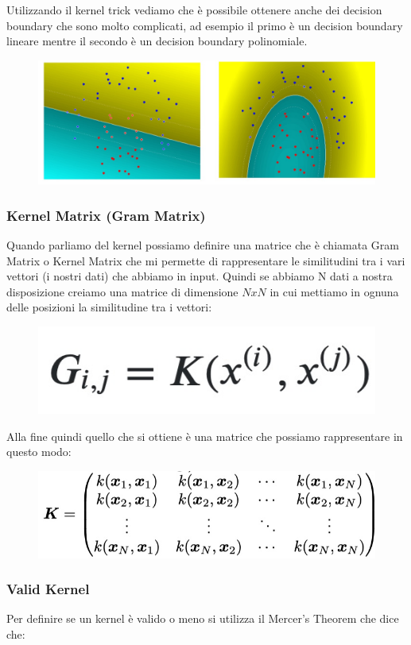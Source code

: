 \documentclass[14pt]{extreport}
\begin{document}
Utilizzando il kernel trick vediamo che è possibile ottenere anche dei decision boundary che sono molto complicati, ad esempio il primo è un decision
boundary lineare mentre il secondo è un decision boundary polinomiale.
\begin{figure}[H]
\centering
\includegraphics[width=0.5\linewidth]{339.jpeg}
\end{figure}

\subsubsection{Kernel Matrix (Gram Matrix)}

Quando parliamo del kernel possiamo definire una matrice che è chiamata Gram Matrix o Kernel Matrix che mi permette di rappresentare le similitudini
tra i vari vettori (i nostri dati) che abbiamo in input. Quindi se abbiamo N dati a nostra disposizione creiamo una matrice di dimensione $NxN$ in cui
mettiamo in ognuna delle posizioni la similitudine tra i vettori:
\begin{figure}[H]
\centering
\includegraphics[width=0.2\linewidth]{340.jpeg}
\end{figure}

Alla fine quindi quello che si ottiene è una matrice che possiamo rappresentare in questo modo:

\begin{figure}[H]
\centering
\includegraphics[width=0.5\linewidth]{341.jpeg}
\end{figure}


\subsubsection{Valid Kernel}

Per definire se un kernel è valido o meno si utilizza il Mercer's Theorem che dice che:
\end{document}
